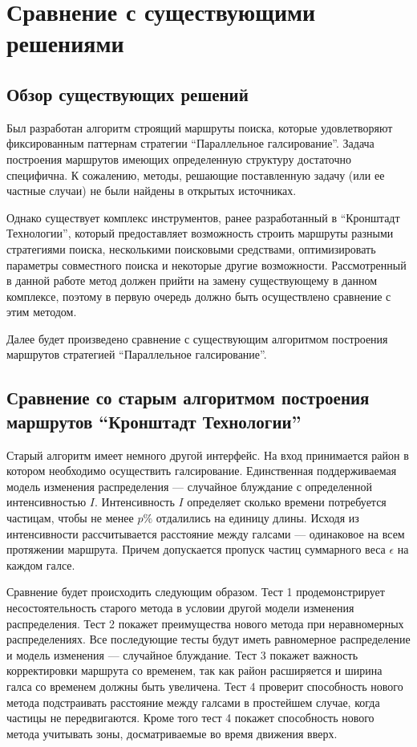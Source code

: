 \chapter{Сравнение с существующими решениями}
\section{Обзор существующих решений}
Был разработан алгоритм строящий маршруты поиска, которые удовлетворяют фиксированным паттернам
стратегии ``Параллельное галсирование''. Задача построения маршрутов имеющих определенную
структуру достаточно специфична. К сожалению, методы, решающие поставленную задачу (или
ее частные случаи) не были найдены в открытых источниках.

 Однако существует комплекс инструментов, ранее разработанный в ``Кронштадт Технологии'',
который предоставляет возможность строить маршруты разными стратегиями поиска, несколькими
поисковыми средствами, оптимизировать параметры совместного поиска и некоторые другие возможности.
Рассмотренный в данной работе метод должен прийти на замену существующему в данном комплексе,
поэтому в первую очередь должно быть осуществлено сравнение с этим методом.

Далее будет произведено сравнение с существующим алгоритмом построения маршрутов стратегией
``Параллельное галсирование''.

\FloatBarrier
\section{Сравнение со старым алгоритмом построения маршрутов ``Кронштадт Технологии''}
Старый алгоритм имеет немного другой интерфейс. На вход принимается район в котором необходимо
осуществить галсирование. Единственная поддерживаемая модель изменения распределения ---
случайное блуждание с определенной интенсивностью $I$. Интенсивность $I$ определяет сколько
времени потребуется частицам, чтобы не менее $p\%$ отдалились на единицу длины. Исходя из
интенсивности рассчитывается расстояние между галсами --- одинаковое на всем протяжении маршрута.
Причем допускается пропуск частиц суммарного веса $\epsilon$ на каждом галсе.

Сравнение будет происходить следующим образом. Тест 1 продемонстрирует несостоятельность старого
метода в условии другой модели изменения распределения. Тест 2 покажет преимущества нового метода
при неравномерных распределениях. Все последующие тесты будут иметь равномерное распределение
и модель изменения --- случайное блуждание. Тест 3 покажет важность корректировки маршрута со
временем, так как район расширяется и ширина галса со временем должны быть увеличена.
Тест 4 проверит способность нового метода подстраивать расстояние между галсами в простейшем случае,
когда частицы не передвигаются. Кроме того тест 4 покажет способность нового метода учитывать зоны,
досматриваемые во время движения вверх.

